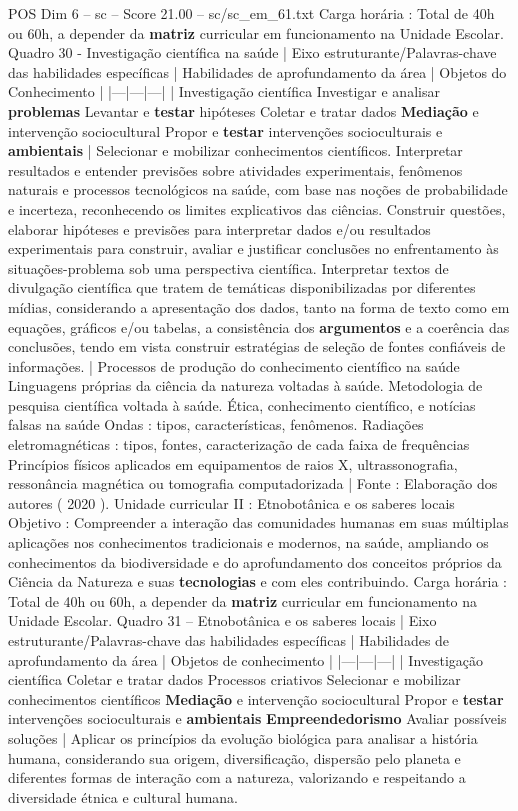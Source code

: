 \begin{textsample}{POS Dim 6 – sc – Score 21.00 – sc/sc\_em\_61.txt}
Carga horária : Total de 40h ou 60h, a depender da \textbf{matriz} curricular em funcionamento na Unidade Escolar.
Quadro 30 - Investigação científica na saúde | Eixo estruturante/Palavras-chave das habilidades específicas | Habilidades de aprofundamento da área | Objetos do Conhecimento | |---|---|---| | Investigação científica Investigar e analisar \textbf{problemas} Levantar e \textbf{testar} hipóteses Coletar e tratar dados \textbf{Mediação} e intervenção sociocultural Propor e \textbf{testar} intervenções socioculturais e \textbf{ambientais} | Selecionar e mobilizar conhecimentos científicos.
Interpretar resultados e entender previsões sobre atividades experimentais, fenômenos naturais e processos tecnológicos na saúde, com base nas noções de probabilidade e incerteza, reconhecendo os limites explicativos das ciências.
Construir questões, elaborar hipóteses e previsões para interpretar dados e/ou resultados experimentais para construir, avaliar e justificar conclusões no enfrentamento às situações-problema sob uma perspectiva científica.
Interpretar textos de divulgação científica que tratem de temáticas disponibilizadas por diferentes mídias, considerando a apresentação dos dados, tanto na forma de texto como em equações, gráficos e/ou tabelas, a consistência dos \textbf{argumentos} e a coerência das conclusões, tendo em vista construir estratégias de seleção de fontes confiáveis de informações. | Processos de produção do conhecimento científico na saúde Linguagens próprias da ciência da natureza voltadas à saúde.
Metodologia de pesquisa científica voltada à saúde.
Ética, conhecimento científico, e notícias falsas na saúde Ondas : tipos, características, fenômenos.
Radiações eletromagnéticas : tipos, fontes, caracterização de cada faixa de frequências Princípios físicos aplicados em equipamentos de raios X, ultrassonografia, ressonância magnética ou tomografia computadorizada | Fonte : Elaboração dos autores ( 2020 ).
Unidade curricular II : Etnobotânica e os saberes locais Objetivo : Compreender a interação das comunidades humanas em suas múltiplas aplicações nos conhecimentos tradicionais e modernos, na saúde, ampliando os conhecimentos da biodiversidade e do aprofundamento dos conceitos próprios da Ciência da Natureza e suas \textbf{tecnologias} e com eles contribuindo.
Carga horária : Total de 40h ou 60h, a depender da \textbf{matriz} curricular em funcionamento na Unidade Escolar.
Quadro 31 – Etnobotânica e os saberes locais | Eixo estruturante/Palavras-chave das habilidades específicas | Habilidades de aprofundamento da área | Objetos de conhecimento | |---|---|---| | Investigação científica Coletar e tratar dados Processos criativos Selecionar e mobilizar conhecimentos científicos \textbf{Mediação} e intervenção sociocultural Propor e \textbf{testar} intervenções socioculturais e \textbf{ambientais} \textbf{Empreendedorismo} Avaliar possíveis soluções | Aplicar os princípios da evolução biológica para analisar a história humana, considerando sua origem, diversificação, dispersão pelo planeta e diferentes formas de interação com a natureza, valorizando e respeitando a diversidade étnica e cultural humana.

\end{textsample}
